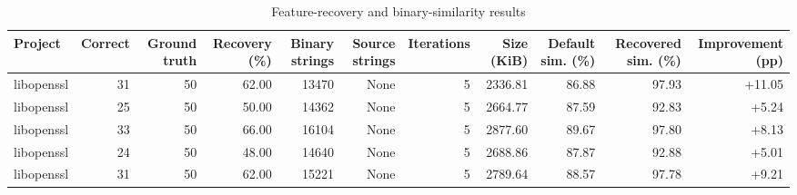 \begin{table}[htbp]
\centering
\caption{Feature-recovery and binary-similarity results}
\label{tab:feature-recovery-results}
\small
\begin{tabular}{lrrrrrrrrrr}
\toprule
Project & Correct & Ground truth & Recovery (\%) & Binary strings & Source strings & Iterations & Size (KiB) & Default sim. (\%) & Recovered sim. (\%) & Improvement (pp) \\
\midrule
libopenssl & 31 & 50 & 62.00 & 13470 & None & 5 & 2336.81 & 86.88 & 97.93 & +11.05 \\
libopenssl & 25 & 50 & 50.00 & 14362 & None & 5 & 2664.77 & 87.59 & 92.83 & +5.24 \\
libopenssl & 33 & 50 & 66.00 & 16104 & None & 5 & 2877.60 & 89.67 & 97.80 & +8.13 \\
libopenssl & 24 & 50 & 48.00 & 14640 & None & 5 & 2688.86 & 87.87 & 92.88 & +5.01 \\
libopenssl & 31 & 50 & 62.00 & 15221 & None & 5 & 2789.64 & 88.57 & 97.78 & +9.21 \\
\bottomrule
\end{tabular}
\end{table}
